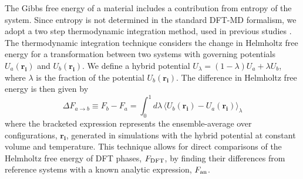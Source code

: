 The Gibbs free energy of a material includes a contribution from entropy of the system.
Since entropy is not determined in the standard DFT-MD formalism, we adopt a two step
thermodynamic integration method, used in previous studies
\citep{Wilson2010,Wilson2012a,Wahl2013,Gonzalez2014}.  The thermodynamic integration technique
considers the change in Helmholtz free energy for a transformation between two systems
with governing potentials $U_a\left(\mathbf{r_i}\right)$ and
$U_b\left(\mathbf{r_i}\right)$. We define a hybrid potential
$U_{\lambda}=\left(1-\lambda\right)U_a+\lambda U_b$, where $\lambda$ is the fraction of
the potential $U_b\left(\mathbf{r_i}\right)$. The difference in Helmholtz free energy is
then given by
\begin{equation} \label{eqn:td_int}
  \Delta F_{a\to b}\equiv F_b - F_a = \int_{0}^{1}{d\lambda\,\langle U_b\left(\mathbf{r_i}\right) -
  U_a\left(\mathbf{r_i}\right) \rangle_{\lambda}}
\end{equation}
where the bracketed expression represents the ensemble-average over configurations,
$\mathbf{r_i}$, generated in simulations with the hybrid potential at constant volume and
temperature. This technique allows for direct comparisons of the Helmholtz free energy of
DFT phases, $F_{\rm DFT}$, by finding their differences from reference systems with a known
analytic expression, $F_{\rm an}$. 

